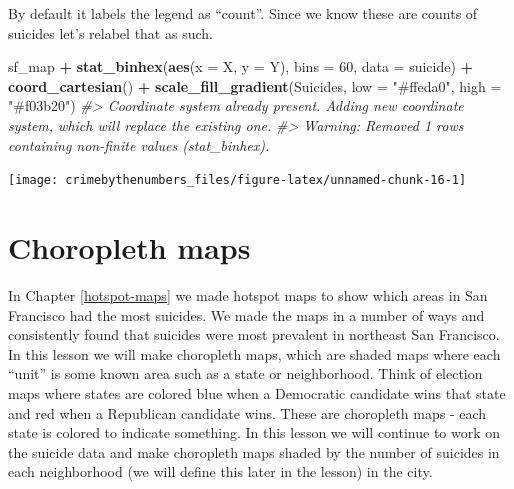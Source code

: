 \documentclass[
  12pt,
]{book}
\newenvironment{Shaded}{\begin{snugshade}}{\end{snugshade}}
\newcommand{\CommentTok}[1]{\textcolor[rgb]{0.37,0.37,0.37}{\textit{#1}}}
\newcommand{\DataTypeTok}[1]{\textcolor[rgb]{0.27,0.27,0.27}{#1}}
\newcommand{\DecValTok}[1]{\textcolor[rgb]{0.06,0.06,0.06}{#1}}
\newcommand{\KeywordTok}[1]{\textcolor[rgb]{0.27,0.27,0.27}{\textbf{#1}}}
\newcommand{\NormalTok}[1]{#1}
\newcommand{\OperatorTok}[1]{\textcolor[rgb]{0.43,0.43,0.43}{\textbf{#1}}}
\newcommand{\StringTok}[1]{\textcolor[rgb]{0.5,0.5,0.5}{#1}}
\begin{document}
By default it labels the legend as ``count''. Since we know these are counts of suicides let's relabel that as such.

\begin{Shaded}
\begin{Highlighting}[]
\NormalTok{sf\_map }\OperatorTok{+}
\StringTok{  }\KeywordTok{stat\_binhex}\NormalTok{(}\KeywordTok{aes}\NormalTok{(}\DataTypeTok{x =}\NormalTok{ X, }\DataTypeTok{y =}\NormalTok{ Y),}
              \DataTypeTok{bins  =} \DecValTok{60}\NormalTok{,}
              \DataTypeTok{data =}\NormalTok{ suicide) }\OperatorTok{+}
\StringTok{  }\KeywordTok{coord\_cartesian}\NormalTok{() }\OperatorTok{+}
\StringTok{  }\KeywordTok{scale\_fill\_gradient}\NormalTok{(}\StringTok{\textquotesingle{}Suicides\textquotesingle{}}\NormalTok{,}
                      \DataTypeTok{low =} \StringTok{"\#ffeda0"}\NormalTok{,}
                      \DataTypeTok{high =} \StringTok{"\#f03b20"}\NormalTok{)}
\CommentTok{\#\textgreater{} Coordinate system already present. Adding new coordinate system, which will replace the existing one.}
\CommentTok{\#\textgreater{} Warning: Removed 1 rows containing non{-}finite values (stat\_binhex).}
\end{Highlighting}
\end{Shaded}

\begin{center}\texttt{[image: crimebythenumbers\_files/figure-latex/unnamed-chunk-16-1]} \end{center}

\hypertarget{choropleth-maps}{%
\chapter{Choropleth maps}\label{choropleth-maps}}

In Chapter \ref{hotspot-maps} we made hotspot maps to show which areas in San Francisco had the most suicides. We made the maps in a number of ways and consistently found that suicides were most prevalent in northeast San Francisco. In this lesson we will make choropleth maps, which are shaded maps where each ``unit'' is some known area such as a state or neighborhood. Think of election maps where states are colored blue when a Democratic candidate wins that state and red when a Republican candidate wins. These are choropleth maps - each state is colored to indicate something. In this lesson we will continue to work on the suicide data and make choropleth maps shaded by the number of suicides in each neighborhood (we will define this later in the lesson) in the city.
\end{document}
